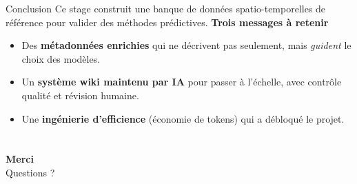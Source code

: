 \documentclass[aspectratio=169,11pt]{beamer}
\begin{document}
\begin{frame}{Conclusion}
\small
Ce stage construit une banque de données spatio-temporelles de référence pour valider des méthodes prédictives.
\vspace{0.3cm}
\textbf{Trois messages à retenir}
\begin{itemize}
    \item Des \textbf{métadonnées enrichies} qui ne décrivent pas seulement, mais \emph{guident} le choix des modèles.
    \vspace{0.15cm}
    \item Un \textbf{système wiki maintenu par IA} pour passer à l'échelle, avec contrôle qualité et révision humaine.
    \vspace{0.15cm}
    \item Une \textbf{ingénierie d'efficience} (économie de tokens) qui a débloqué le projet.
\end{itemize}
\end{frame}

\section*{}
\begin{frame}[plain]
\centering
\vfill
{\Huge \textbf{Merci}}
\\[0.5cm]
{\large Questions ?}
\vfill
\end{frame}
\end{document}
